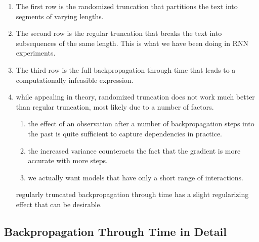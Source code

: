 \begin{enumerate}
    \item The first row is the randomized truncation that partitions the text into segments of varying lengths.

    \item The second row is the regular truncation that breaks the text into subsequences of the same length. This is what we have been doing in RNN experiments.

    \item The third row is the full backpropagation through time that leads to a computationally infeasible expression.

    \vspace{0.5cm}
    \item while appealing in theory, randomized truncation does not work much better than regular truncation, most likely due to a number of factors. 
    \begin{enumerate}
        \item the effect of an observation after a number of backpropagation steps into the past is quite sufficient to capture dependencies in practice. 
        
        \item the increased variance counteracts the fact that the gradient is more accurate with more steps. 
        
        \item we actually want models that have only a short range of interactions.
    \end{enumerate}
    
    regularly truncated backpropagation through time has a slight regularizing effect that can be desirable.

    
\end{enumerate}


\subsection{Backpropagation Through Time in Detail \cite{dnn-1}}

